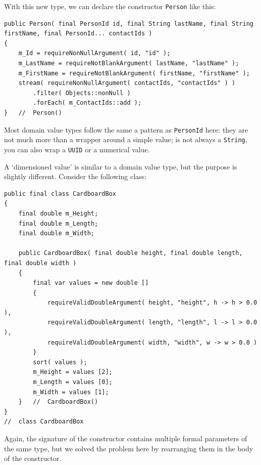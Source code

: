 With this new type, we can declare the constructor \lstinline|Person| like this:
\begin{lstlisting}
public Person( final PersonId id, final String lastName, final String firstName, final PersonId... contactIds )
{
    m_Id = requireNonNullArgument( id, "id" );
    m_LastName = requireNotBlankArgument( lastName, "lastName" );
    m_FirstName = requireNotBlankArgument( firstName, "firstName" );
    stream( requireNonNullArgument( contactIds, "contactIds" ) )
        .filter( Objects::nonNull )
        .forEach( m_ContactIds::add );
}   //  Person()
\end{lstlisting}

Most domain value types follow the same a pattern as \lstinline|PersonId| here: they are  not much more than a wrapper around a simple value; is not always a \lstinline|String|, you can also wrap a \lstinline|UUID|\autocite{ORACLE_DOC_UUID_CLASS} or a numerical value.

A ‘dimensioned value’ is similar to a domain value type, but the purpose is slightly different. Consider the following class:
\begin{lstlisting}
public final class CardboardBox
{
    final double m_Height;
    final double m_Length;
    final double m_Width;
    
    public CardboardBox( final double height, final double length, final double width )
    {
        final var values = new double [] 
        { 
            requireValidDoubleArgument( height, "height", h -> h > 0.0 ),
            requireValidDoubleArgument( length, "length", l -> l > 0.0 ),
            requireValidDoubleArgument( width, "width", w -> w > 0.0 )
        }
        sort( values );
        m_Height = values [2];
        m_Length = values [0];
        m_Width = values [1];
    }   //  CardboardBox()
}
//  class CardboardBox
\end{lstlisting}

Again, the signature of the constructor contains multiple formal parameters of the same type, but we solved the problem here by rearranging them in the body of the constructor.

